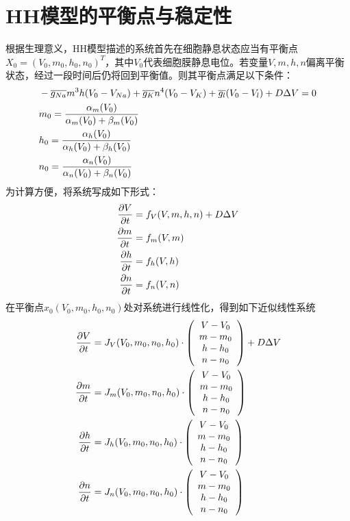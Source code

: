 \documentclass[
bachelor,
nofont, %
pdflinks,
]{xjtuthesis}
\begin{document}
\section{HH模型的平衡点与稳定性}
根据生理意义，HH模型描述的系统首先在细胞静息状态应当有平衡点$X_0=(V_0,m_0,h_0,n_0)^T$，其中$V_0$代表细胞膜静息电位。若变量$V,m,h,n$偏离平衡状态，经过一段时间后仍将回到平衡值。则其平衡点满足以下条件：
\begin{align}
\notag & -\overline{g_{Na}} m^3h(V_0 -V_{Na})+ \overline{g_{K}} n^4(V_0-V_{K})+\overline{g_l}(V_0-V_{l}) +D \Delta V=0 \\
& m_0 = \dfrac{\alpha_m (V_0)}{\alpha_m (V_0)+\beta_m (V_0)} \\
\notag & h_0 =\frac{ \alpha_h (V_0)}{ \alpha_h (V_0)+ \beta_h (V_0)} \\
\notag & n_0= \frac{\alpha_n (V_0)}{\alpha_n (V_0)+\beta_n (V_0)}
\end{align}
为计算方便，将系统写成如下形式：
\begin{align}
\notag \frac{\partial V}{\partial t} &= f_V(V,m,h,n)+D\Delta V\\
\frac{\partial m}{\partial t} &= f_m(V,m) \\
\notag \frac{\partial h}{\partial t} &= f_h(V,h)\\
\notag \frac{\partial n}{\partial t} &= f_n(V,n) 
\end{align}
在平衡点$x_0(V_{0},m_{0},h_{0},n_{0})$处对系统进行线性化，得到如下近似线性系统
\begin{align}
\notag \frac{\partial V}{\partial t} &= J_{V}(V_0,m_0,n_0,h_0)\cdot
\left(
\begin{array}{c}
V-V_0\\
m-m_0\\
h-h_0\\
n-n_0
\end{array}
\right)
+D\Delta V\\
\frac{\partial m}{\partial t} &= J_{m}(V_0,m_0,n_0,h_0)\cdot
\left(\begin{array}{c}
V-V_0\\
m-m_0\\
h-h_0\\
n-n_0
\end{array}
\right) \\
\notag \frac{\partial h}{\partial t} &= J_{h}(V_0,m_0,n_0,h_0)\cdot
\left(
\begin{array}{c}
V-V_0\\
m-m_0\\
h-h_0\\
n-n_0
\end{array}
\right)\\
\notag \frac{\partial n}{\partial t} &= J_{n}(V_0,m_0,n_0,h_0)\cdot
\left(
\begin{array}{c}
V-V_0\\
m-m_0\\
h-h_0\\
n-n_0
\end{array}
\right)
\end{align}
\end{document}
